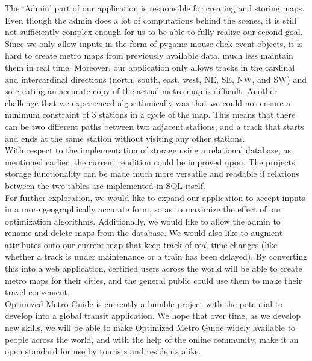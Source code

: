 \documentclass[fontsize=11pt]{article}
\begin{document}
    The `Admin' part of our application is responsible for creating and storing maps. Even though the admin does a lot of computations behind the scenes, it is still not sufficiently complex enough for us to be able to fully realize our second goal. Since we only allow inputs in the form of pygame mouse click event objects, it is hard to create metro maps from previously available data, much less maintain them in real time. Moreover, our application only allows tracks in the cardinal and intercardinal directions (north, south, east, west, NE, SE, NW, and SW) and so creating an accurate copy of the actual metro map is difficult. Another challenge that we experienced algorithmically was that we could not ensure a minimum constraint of 3 stations in a cycle of the map. This means that there can be two different paths between two adjacent stations, and a track that starts and ends at the same station without visiting any other stations. \\

    With respect to the implementation of storage using a relational database, as mentioned earlier, the current rendition could be improved upon. The projects storage functionality can be made much more versatile and readable if relations between the two tables are implemented in SQL itself. \\

    For further exploration, we would like to expand our application to accept inputs in a more geographically accurate form, so as to maximize the effect of our optimization algorithms. Additionally, we would like to allow the admin to rename and delete maps from the database. We would also like to augment attributes onto our current map that keep track of real time changes (like whether a track is under maintenance or a train has been delayed). By converting this into a web application, certified users across the world will be able to create metro maps for their cities, and the general public could use them to make their travel convenient. \\

    Optimized Metro Guide is currently a humble project with the potential to develop into a global transit application. We hope that over time, as we develop new skills, we will be able to make Optimized Metro Guide widely available to people across the world, and with the help of the online community, make it an open standard for use by tourists and residents alike.
\end{document}
